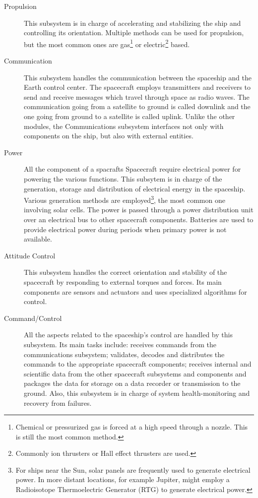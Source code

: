 \begin{description}
  \item[Propulsion] This subsystem is in charge of accelerating and stabilizing
  the ship and controlling its orientation. Multiple methods can be used for
  propulsion, but the most common ones are gas\footnote{Chemical or pressurized
  gas is forced at a high speed through a nozzle. This is still the most common
  method.} or electric\footnote{Commonly ion thrusters or Hall effect thrusters
  are used.} based.
  \item[Communication] This subsystem handles the communication between the
  spaceship and the Earth control center. The spacecraft employs transmitters
  and receivers to send and receive messages which travel through space as radio
  waves. The communication going from a satellite to ground is called downlink
  and the one going from ground to a satellite is called uplink. Unlike the
  other modules, the Communications subsystem interfaces not only with
  components on the ship, but also with external entities.
  \item[Power] All the component of a spacrafts Spacecraft require electrical
  power for powering the various functions. This subsytem is in charge of the
  generation, storage and distribution of electrical energy in the spaceship.
  Various generation methods are employed\footnote{ For ships near the Sun,
  solar panels are frequently used to generate electrical power. In more distant
  locations, for example Jupiter, might employ a Radioisotope Thermoelectric
  Generator (RTG) to generate electrical power.}, the most common one involving
  solar cells. The power is passed through a power distribution unit over an
  electrical bus to other spacecraft components. Batteries are used to provide
  electrical power during periods when primary power is not available.
  \item[Attitude Control] This subsystem handles the correct orientation and
  stability of the spacecraft by responding to external torques and forces. Its
  main components are sensors and actuators and uses specialized algorithms for
  control.
  \item[Command/Control] All the aspects related to the spaceship's control are
  handled by this subsystem. Its main tasks include: receives commands from
  the communications subsystem; validates, decodes and distributes the commands
  to the appropriate spacecraft components; receives internal and scientific
  data from the other spacecraft subsystems and components and packages the data
  for storage on a data recorder or transmission to the ground. Also, this
  subsystem is in charge of system health-monitoring and recovery from failures.
\end{description}

